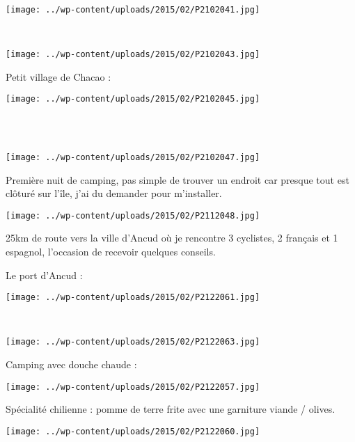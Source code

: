 \pagebreak
~
\begin{center} \texttt{[image: ../wp-content/uploads/2015/02/P2102041.jpg]} \end{center}
~
\begin{center} \texttt{[image: ../wp-content/uploads/2015/02/P2102043.jpg]} \end{center}
\vspace{-\topsep}

\pagebreak
 Petit village de Chacao :\\
\begin{center} \texttt{[image: ../wp-content/uploads/2015/02/P2102045.jpg]} \end{center}
~\\

~
\begin{center} \texttt{[image: ../wp-content/uploads/2015/02/P2102047.jpg]} \end{center}
\vspace{-\topsep}

\pagebreak
 Première nuit de camping, pas simple de trouver un endroit car presque tout est clôturé sur l'île, j'ai du demander pour m'installer. 
\begin{center} \texttt{[image: ../wp-content/uploads/2015/02/P2112048.jpg]} \end{center}

 25km de route vers la ville d'Ancud où je rencontre 3 cyclistes, 2 français et 1 espagnol, l'occasion de recevoir quelques conseils.

 Le port d'Ancud :
\begin{center} \texttt{[image: ../wp-content/uploads/2015/02/P2122061.jpg]} \end{center}
\vspace{-\topsep}

\pagebreak
~
\vspace{-3mm}
\begin{center} \texttt{[image: ../wp-content/uploads/2015/02/P2122063.jpg]} \end{center}

 Camping avec douche chaude :
\begin{center} \texttt{[image: ../wp-content/uploads/2015/02/P2122057.jpg]} \end{center}
\vspace{-\topsep}

\pagebreak
Spécialité chilienne : pomme de terre frite avec une garniture viande / olives.
\begin{center} \texttt{[image: ../wp-content/uploads/2015/02/P2122060.jpg]} \end{center}